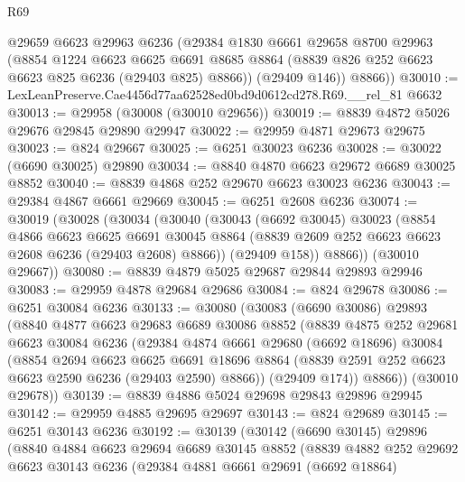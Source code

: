 \begin{lexlean}{R69}
\begin{coremodule}
{        @29659
        @6623
        @29963
        @6236
        (@29384
          @1830
          @6661
          @29658
          @8700
          @29963
          (@8854
            @1224
            @6623
            @6625
            @6691
            @8685
            @8864
            (@8839 @826 @252 @6623 @6623 @825 @6236 (@29403 @825) @8866))
          (@29409 @146))
        @8866))
@30010 := LexLeanPreserve.Cae4456d77aa62528ed0bd9d0612cd278.R69.__rel_81 @6632
@30013 := @29958 (@30008 (@30010 @29656))
@30019 := @8839 @4872 @5026 @29676 @29845 @29890 @29947
@30022 := @29959 @4871 @29673 @29675
@30023 := @824 @29667
@30025 := @6251 @30023 @6236
@30028 := @30022 (@6690 @30025) @29890
@30034 := @8840 @4870 @6623 @29672 @6689 @30025 @8852
@30040 := @8839 @4868 @252 @29670 @6623 @30023 @6236
@30043 := @29384 @4867 @6661 @29669
@30045 := @6251 @2608 @6236
@30074 := @30019
    (@30028
      (@30034
        (@30040
          (@30043
            (@6692 @30045)
            @30023
            (@8854
              @4866
              @6623
              @6625
              @6691
              @30045
              @8864
              (@8839 @2609 @252 @6623 @6623 @2608 @6236 (@29403 @2608) @8866))
            (@29409 @158))
          @8866))
      (@30010 @29667))
@30080 := @8839 @4879 @5025 @29687 @29844 @29893 @29946
@30083 := @29959 @4878 @29684 @29686
@30084 := @824 @29678
@30086 := @6251 @30084 @6236
@30133 := @30080
    (@30083
      (@6690 @30086)
      @29893
      (@8840
        @4877
        @6623
        @29683
        @6689
        @30086
        @8852
        (@8839
          @4875
          @252
          @29681
          @6623
          @30084
          @6236
          (@29384
            @4874
            @6661
            @29680
            (@6692 @18696)
            @30084
            (@8854
              @2694
              @6623
              @6625
              @6691
              @18696
              @8864
              (@8839 @2591 @252 @6623 @6623 @2590 @6236 (@29403 @2590) @8866))
            (@29409 @174))
          @8866))
      (@30010 @29678))
@30139 := @8839 @4886 @5024 @29698 @29843 @29896 @29945
@30142 := @29959 @4885 @29695 @29697
@30143 := @824 @29689
@30145 := @6251 @30143 @6236
@30192 := @30139
    (@30142
      (@6690 @30145)
      @29896
      (@8840
        @4884
        @6623
        @29694
        @6689
        @30145
        @8852
        (@8839
          @4882
          @252
          @29692
          @6623
          @30143
          @6236
          (@29384
            @4881
            @6661
            @29691
            (@6692 @18864)
}
\end{coremodule}
\end{lexlean}
